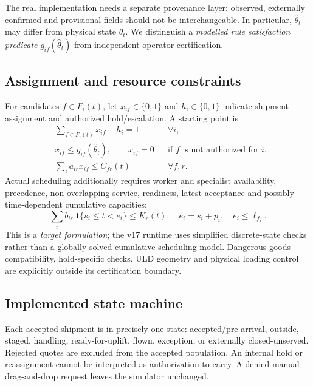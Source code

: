 \documentclass[10pt,a4paper]{article}
\theoremstyle{definition}\newtheorem{definition}[theorem]{Definition}
\theoremstyle{remark}\newtheorem{remark}[theorem]{Remark}
\newcommand{\1}{\mathbbm 1}
\begin{document}
The real implementation needs a separate provenance layer: observed, externally confirmed and provisional fields should not be interchangeable. In particular, $\hat\theta_t$ may differ from physical state $\theta_t$. We distinguish a \emph{modelled rule satisfaction predicate} $g_{if}(\hat\theta_t)$ from independent operator certification.

\subsection{Assignment and resource constraints}
For candidates $f\in F_i(t)$, let $x_{if}\in\{0,1\}$ and $h_i\in\{0,1\}$ indicate shipment assignment and authorized hold/escalation. A starting point is
\begin{align}
&\sum_{f\in F_i(t)}x_{if}+h_i=1 &&\forall i,\label{eq:assign}\\
&x_{if}\le g_{if}(\hat\theta_t),\qquad x_{if}=0&&\text{if $f$ is not authorized for $i$},\\
&\sum_i a_{ir}x_{if}\le C_{fr}(t)&&\forall f,r.\label{eq:capacity}
\end{align}
Actual scheduling additionally requires worker and specialist availability, precedence, non-overlapping service, readiness, latest acceptance and possibly time-dependent cumulative capacities:
\begin{equation}\sum_i b_{ir}\,\mathbf{1}\{s_i\le t<e_i\}\le K_r(t),\quad e_i=s_i+p_i,\quad e_i\le\ell_{f_i}.\label{eq:resource}\end{equation}
This is a \emph{target formulation}; the v17 runtime uses simplified discrete-state checks rather than a globally solved cumulative scheduling model. Dangerous-goods compatibility, hold-specific checks, ULD geometry and physical loading control are explicitly outside its certification boundary.

\subsection{Implemented state machine}
Each accepted shipment is in precisely one state: accepted/pre-arrival, outside, staged, handling, ready-for-uplift, flown, exception, or externally closed-unserved. Rejected quotes are excluded from the accepted population. An internal hold or reassignment cannot be interpreted as authorization to carry. A denied manual drag-and-drop request leaves the simulator unchanged.
\end{document}
